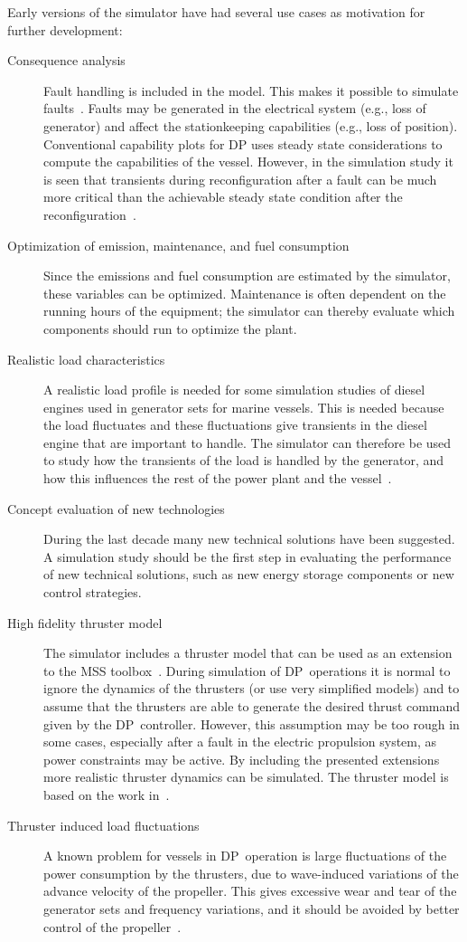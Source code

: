 \documentclass[twocolumn,10pt]{asme2e}
\begin{document}
Early versions of the simulator have had several use cases as motivation for further development:
\begin{description}
\item[Consequence analysis] Fault handling is included in the model. 
This makes it possible to simulate faults~\cite{Bo2013b}.
Faults may be generated in the electrical system (e.g., loss of generator) and affect the stationkeeping capabilities (e.g., loss of position).
Conventional capability plots for DP uses steady state considerations to compute the capabilities of the vessel.
However, in the simulation study it is seen that transients during reconfiguration after a fault can be much more critical than the achievable steady state condition after the reconfiguration~\cite{Pivano2014}.
\item[Optimization of emission, maintenance, and fuel consumption] Since the emissions and fuel consumption are estimated by the simulator, these variables can be optimized.
Maintenance is often dependent on the running hours of the equipment; the simulator can thereby evaluate which components should run to optimize the plant.
\item[Realistic load characteristics] A realistic load profile is needed for some simulation studies of diesel engines used in generator sets for marine vessels.
This is needed because the load fluctuates and these fluctuations give transients in the diesel engine that are important to handle.
The simulator can therefore be used to study how the transients of the load is handled by the generator, and how this influences the rest of the power plant and the vessel~\cite{Bo2013}.
\item[Concept evaluation of new technologies] During the last decade many new technical solutions have been suggested.
A simulation study should be the first step in evaluating the performance of new technical solutions, such as new energy storage components or new control strategies.
\item[High fidelity thruster model] The simulator includes a thruster model that can be used as an extension to the MSS toolbox~\cite{MSS}.
During simulation of DP~operations it is normal to ignore the dynamics of the thrusters (or use very simplified models) and to assume that the thrusters are able to generate the desired thrust command given by the DP~controller.
However, this assumption may be too rough in some cases, especially after a fault in the electric propulsion system, as power constraints may be active.
By including the presented extensions more realistic thruster dynamics can be simulated.
The thruster model is based on the work in~\cite{Smogeli2006}.
\item[Thruster induced load fluctuations]
A known problem for vessels in DP~operation is large fluctuations of the power consumption by the thrusters, due to wave-induced  variations of the advance velocity of the propeller. 
This gives excessive wear and tear of the generator sets and frequency variations, and it should be avoided by better control of the propeller~\cite{Sorensen2009,Veksler2014}.
\end{description} 
\end{document}
